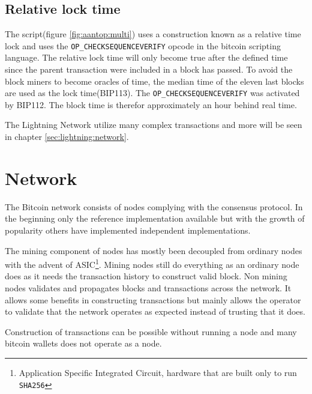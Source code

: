 \subsection{Relative lock time}
\label{sec:rlt}

The script(figure \ref{fig:aantop:multi}) uses a construction known as a relative time lock and uses the \texttt{OP\_CHECKSEQUENCEVERIFY} opcode in the bitcoin scripting language\cite{bip:0068:sequence:lock:time}. The relative lock time will only become true after the defined time since the parent transaction were included in a block has passed. To avoid the block miners to become oracles of time, the median time of the eleven last blocks are used as the lock time(BIP113\cite{bip:0113:median:time:passed}). The \texttt{OP\_CHECKSEQUENCEVERIFY} was activated by BIP112\cite{bip:0112:sequence:lock:time:soft:fork}. The block time is therefor approximately an hour behind real time.

The Lightning Network utilize many complex transactions and more will be seen in chapter \ref{sec:lightning:network}.

\section{Network}

The Bitcoin network consists of nodes complying with the consensus protocol. In the beginning only the reference implementation available but with the growth of popularity others have implemented independent implementations\cite{repository:bitcoin}\cite{repository:btcd}\cite{repository:neutrino}.

The mining component of nodes has mostly been decoupled from ordinary nodes with the advent of ASIC\footnote{Application Specific Integrated Circuit, hardware that are built only to run \texttt{SHA256}}. Mining nodes still do everything as an ordinary node does as it needs the transaction history to construct valid block. Non mining nodes validates and propagates blocks and transactions across the network. It allows some benefits in constructing transactions but mainly allows the operator to validate that the network operates as expected instead of trusting that it does.

Construction of transactions can be possible without running a node and many bitcoin wallets does not operate as a node.

 

